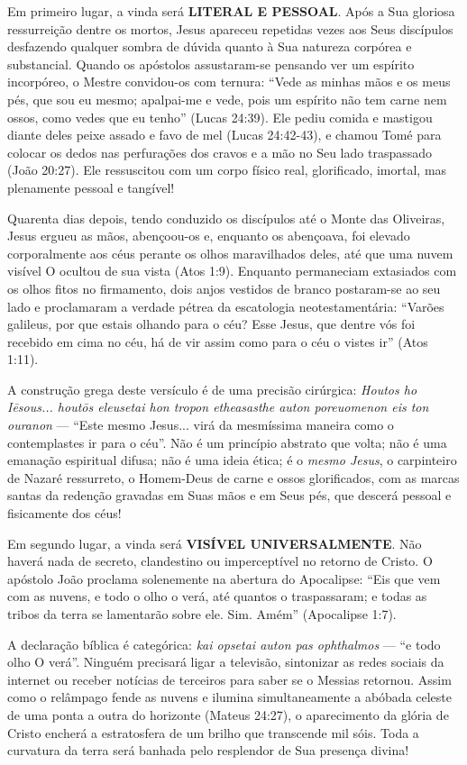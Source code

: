 \documentclass[11pt,a4paper,openany]{book}
\begin{document}
Em primeiro lugar, a vinda será \textbf{LITERAL E PESSOAL}.
Após a Sua gloriosa ressurreição dentre os mortos, Jesus apareceu repetidas vezes aos Seus discípulos desfazendo qualquer sombra de dúvida quanto à Sua natureza corpórea e substancial. Quando os apóstolos assustaram-se pensando ver um espírito incorpóreo, o Mestre convidou-os com ternura: ``Vede as minhas mãos e os meus pés, que sou eu mesmo; apalpai-me e vede, pois um espírito não tem carne nem ossos, como vedes que eu tenho'' (Lucas 24:39). Ele pediu comida e mastigou diante deles peixe assado e favo de mel (Lucas 24:42-43), e chamou Tomé para colocar os dedos nas perfurações dos cravos e a mão no Seu lado traspassado (João 20:27). Ele ressuscitou com um corpo físico real, glorificado, imortal, mas plenamente pessoal e tangível!

Quarenta dias depois, tendo conduzido os discípulos até o Monte das Oliveiras, Jesus ergueu as mãos, abençoou-os e, enquanto os abençoava, foi elevado corporalmente aos céus perante os olhos maravilhados deles, até que uma nuvem visível O ocultou de sua vista (Atos 1:9). Enquanto permaneciam extasiados com os olhos fitos no firmamento, dois anjos vestidos de branco postaram-se ao seu lado e proclamaram a verdade pétrea da escatologia neotestamentária:
``Varões galileus, por que estais olhando para o céu? Esse Jesus, que dentre vós foi recebido em cima no céu, há de vir assim como para o céu o vistes ir'' (Atos 1:11).

A construção grega deste versículo é de uma precisão cirúrgica:
\textit{Houtos ho Iēsous... houtōs eleusetai hon tropon etheasasthe auton poreuomenon eis ton ouranon} — ``Este mesmo Jesus... virá da mesmíssima maneira como o contemplastes ir para o céu''.
Não é um princípio abstrato que volta; não é uma emanação espiritual difusa; não é uma ideia ética; é o \textit{mesmo Jesus}, o carpinteiro de Nazaré ressurreto, o Homem-Deus de carne e ossos glorificados, com as marcas santas da redenção gravadas em Suas mãos e em Seus pés, que descerá pessoal e fisicamente dos céus!

Em segundo lugar, a vinda será \textbf{VISÍVEL UNIVERSALMENTE}.
Não haverá nada de secreto, clandestino ou imperceptível no retorno de Cristo. O apóstolo João proclama solenemente na abertura do Apocalipse:
``Eis que vem com as nuvens, e todo o olho o verá, até quantos o traspassaram; e todas as tribos da terra se lamentarão sobre ele. Sim. Amém'' (Apocalipse 1:7).

A declaração bíblica é categórica: \textit{kai opsetai auton pas ophthalmos} — ``e todo olho O verá''. Ninguém precisará ligar a televisão, sintonizar as redes sociais da internet ou receber notícias de terceiros para saber se o Messias retornou. Assim como o relâmpago fende as nuvens e ilumina simultaneamente a abóbada celeste de uma ponta a outra do horizonte (Mateus 24:27), o aparecimento da glória de Cristo encherá a estratosfera de um brilho que transcende mil sóis. Toda a curvatura da terra será banhada pelo resplendor de Sua presença divina!
\end{document}
